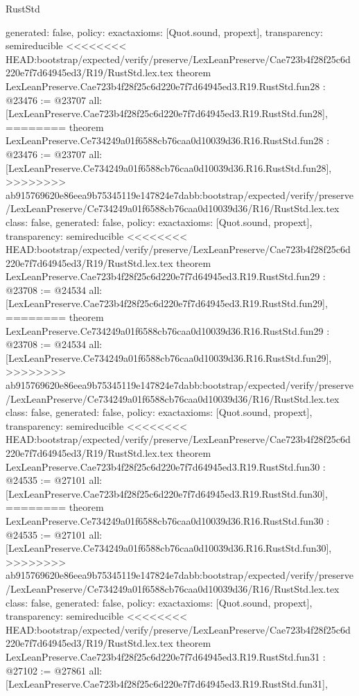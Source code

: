 \begin{lexlean}{RustStd}
\begin{coremodule}
{\begin{coremodule}
{{{{{{{{{{{{{{{{{{{{{{{{{{{{{{{  generated: false,
  policy: exact{axioms: [Quot.sound, propext]},
  transparency: semireducible
}
<<<<<<<< HEAD:bootstrap/expected/verify/preserve/LexLeanPreserve/Cae723b4f28f25c6d220e7f7d64945ed3/R19/RustStd.lex.tex
theorem LexLeanPreserve.Cae723b4f28f25c6d220e7f7d64945ed3.R19.RustStd.fun28 : @23476 := @23707 {
  all: [LexLeanPreserve.Cae723b4f28f25c6d220e7f7d64945ed3.R19.RustStd.fun28],
========
theorem LexLeanPreserve.Ce734249a01f6588cb76caa0d10039d36.R16.RustStd.fun28 : @23476 := @23707 {
  all: [LexLeanPreserve.Ce734249a01f6588cb76caa0d10039d36.R16.RustStd.fun28],
>>>>>>>> ab915769620e86eea9b75345119e147824e7dabb:bootstrap/expected/verify/preserve/LexLeanPreserve/Ce734249a01f6588cb76caa0d10039d36/R16/RustStd.lex.tex
  class: false,
  generated: false,
  policy: exact{axioms: [Quot.sound, propext]},
  transparency: semireducible
}
<<<<<<<< HEAD:bootstrap/expected/verify/preserve/LexLeanPreserve/Cae723b4f28f25c6d220e7f7d64945ed3/R19/RustStd.lex.tex
theorem LexLeanPreserve.Cae723b4f28f25c6d220e7f7d64945ed3.R19.RustStd.fun29 : @23708 := @24534 {
  all: [LexLeanPreserve.Cae723b4f28f25c6d220e7f7d64945ed3.R19.RustStd.fun29],
========
theorem LexLeanPreserve.Ce734249a01f6588cb76caa0d10039d36.R16.RustStd.fun29 : @23708 := @24534 {
  all: [LexLeanPreserve.Ce734249a01f6588cb76caa0d10039d36.R16.RustStd.fun29],
>>>>>>>> ab915769620e86eea9b75345119e147824e7dabb:bootstrap/expected/verify/preserve/LexLeanPreserve/Ce734249a01f6588cb76caa0d10039d36/R16/RustStd.lex.tex
  class: false,
  generated: false,
  policy: exact{axioms: [Quot.sound, propext]},
  transparency: semireducible
}
<<<<<<<< HEAD:bootstrap/expected/verify/preserve/LexLeanPreserve/Cae723b4f28f25c6d220e7f7d64945ed3/R19/RustStd.lex.tex
theorem LexLeanPreserve.Cae723b4f28f25c6d220e7f7d64945ed3.R19.RustStd.fun30 : @24535 := @27101 {
  all: [LexLeanPreserve.Cae723b4f28f25c6d220e7f7d64945ed3.R19.RustStd.fun30],
========
theorem LexLeanPreserve.Ce734249a01f6588cb76caa0d10039d36.R16.RustStd.fun30 : @24535 := @27101 {
  all: [LexLeanPreserve.Ce734249a01f6588cb76caa0d10039d36.R16.RustStd.fun30],
>>>>>>>> ab915769620e86eea9b75345119e147824e7dabb:bootstrap/expected/verify/preserve/LexLeanPreserve/Ce734249a01f6588cb76caa0d10039d36/R16/RustStd.lex.tex
  class: false,
  generated: false,
  policy: exact{axioms: [Quot.sound, propext]},
  transparency: semireducible
}
<<<<<<<< HEAD:bootstrap/expected/verify/preserve/LexLeanPreserve/Cae723b4f28f25c6d220e7f7d64945ed3/R19/RustStd.lex.tex
theorem LexLeanPreserve.Cae723b4f28f25c6d220e7f7d64945ed3.R19.RustStd.fun31 : @27102 := @27861 {
  all: [LexLeanPreserve.Cae723b4f28f25c6d220e7f7d64945ed3.R19.RustStd.fun31],
}}}}}}}}}}}}}}}}}}}}}}}}}}}}}}}}}}
\end{coremodule}}
\end{coremodule}
\end{lexlean}
